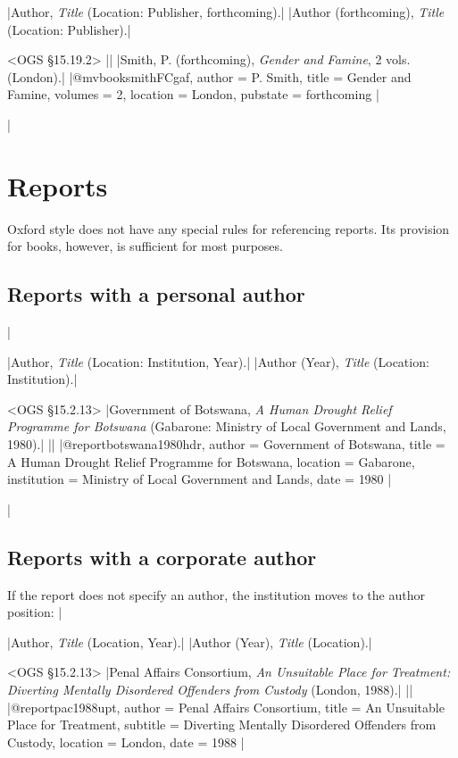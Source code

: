 \documentclass[extrafontsizes,11pt,a4paper,oneside]{memoir}
\newcommand*{\lit}[1]{\textsf{#1}}
\begin{document}
\specs
|Author, \emph{Title} (Location: Publisher, \lit{forthcoming}).|%
|Author (\lit{forthcoming}), \emph{Title} (Location: Publisher).|

\bibexample<OGS \S15.19.2>
||%
|Smith, P. (forthcoming), \emph{Gender and Famine}, 2 vols. (London).|%
|@mvbook{smithFCgaf,
  author = {P. Smith},
  title = {Gender and Famine},
  volumes = {2},
  location = {London},
  pubstate = {forthcoming}
}|

\todoc|
\chapter{Reports}\label{sec:report}

Oxford style does not have any special rules for referencing reports. Its provision for books, however, is sufficient for most purposes.

\section{Reports with a personal author}
|

\specs
|Author, \emph{Title} (Location: Institution, Year).|%
|Author (Year), \emph{Title} (Location: Institution).|

\bibexample<OGS \S15.2.13>
|Government of Botswana, \emph{A Human Drought Relief Programme for Botswana} (Gabarone: Ministry of Local Government and Lands, 1980).|%
||%
|@report{botswana1980hdr,
  author = {{Government of Botswana}},
  title = {A Human Drought Relief Programme for Botswana},
  location = {Gabarone},
  institution = {Ministry of Local Government and Lands},
  date = {1980}
}|
  
\todoc|
\section{Reports with a corporate author}

If the report does not specify an author, the institution moves to the author position:
|

\specs
|Author, \emph{Title} (Location, Year).|%
|Author (Year), \emph{Title} (Location).|

\bibexample<OGS \S15.2.13>
|Penal Affairs Consortium, \emph{An Unsuitable Place for Treatment: Diverting Mentally Disordered Offenders from Custody} (London, 1988).|%
||%
|@report{pac1988upt,
  author = {{Penal Affairs Consortium}},
  title = {An Unsuitable Place for Treatment},
  subtitle = {Diverting Mentally Disordered Offenders from Custody},
  location = {London},
  date = {1988}
}|
\end{document}
